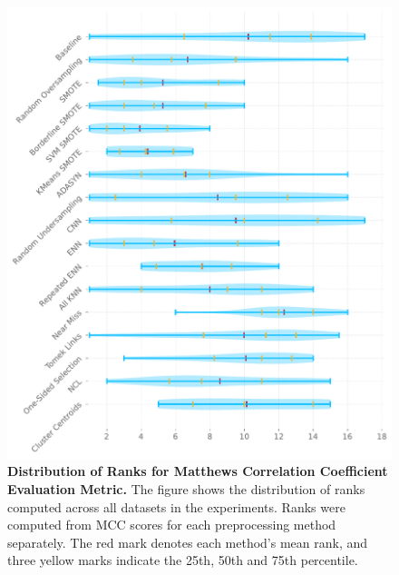 \begin{figure}
    \centering
    \includegraphics[width=\linewidth]{figures/matthews_corr_coef_ranks_distribution.pdf}
    \caption{
        \textbf{Distribution of Ranks for Matthews Correlation Coefficient Evaluation Metric.} The
        figure shows the distribution of ranks computed across all datasets in the experiments.
        Ranks were computed from MCC scores for each preprocessing method separately. The red mark
        denotes each method’s mean rank, and three yellow marks indicate the 25th, 50th and 75th
        percentile.
    }
    \label{figure:mcc_rank_distributions}
\end{figure}

